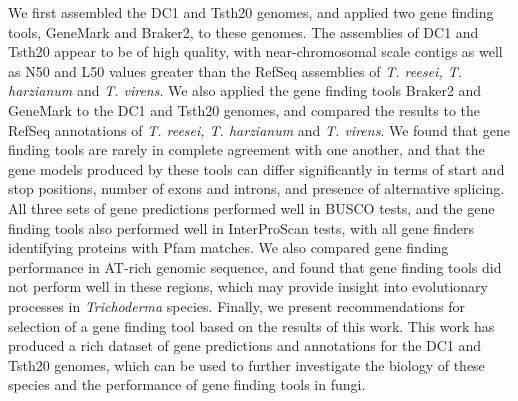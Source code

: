  We first assembled the DC1 and Tsth20 genomes, and applied two gene finding tools, GeneMark and Braker2, to these genomes. The assemblies of DC1 and Tsth20 appear to be of high quality, with near-chromosomal scale contigs as well as N50 and L50 values greater than the RefSeq assemblies of \textit{T. reesei, T. harzianum} and \textit{T. virens}. We also applied the gene finding tools Braker2 and GeneMark to the DC1 and Tsth20 genomes, and compared the results to the RefSeq annotations of \textit{T. reesei, T. harzianum} and \textit{T. virens}. We found that gene finding tools are rarely in complete agreement with one another, and that the gene models produced by these tools can differ significantly in terms of start and stop positions, number of exons and introns, and presence of alternative splicing. All three sets of gene predictions performed well in BUSCO tests, and the gene finding tools also performed well in InterProScan tests, with all gene finders identifying proteins with Pfam matches. We also compared gene finding performance in AT-rich genomic sequence, and found that gene finding tools did not perform well in these regions, which may provide insight into evolutionary processes in \textit{Trichoderma} species. Finally, we present recommendations for selection of a gene finding tool based on the results of this work. This work has produced a rich dataset of gene predictions and annotations for the DC1 and Tsth20 genomes, which can be used to further investigate the biology of these species and the performance of gene finding tools in fungi.